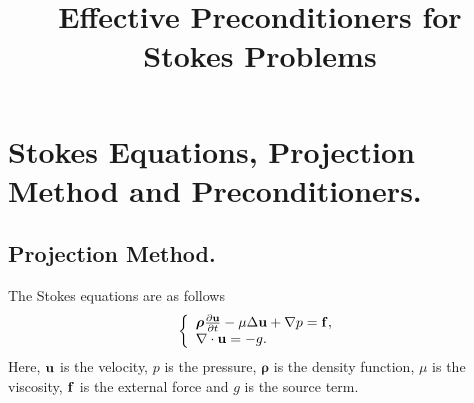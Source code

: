 \documentclass[9pt]{article}
\newcommand{\V}[1]{\boldsymbol{#1}}
\begin{document}
\title{Effective Preconditioners for Stokes Problems}


\date{}          %
\maketitle


%


\section{Stokes Equations, Projection Method and Preconditioners.}
\subsection{Projection Method.}
The Stokes equations are as follows
\begin{equation}\label{Time_Stokes}
 \left \{
        \begin{array} {ll}
                \V{\rho}\frac{\partial{\bf u}}{\partial t} -\mu \Delta{\bf u}+\nabla p
                      =\mathbf{f}, \\
                 \nabla\cdot{\bf u}=-g.
        \end{array}
               \right.
\end{equation}
Here, ${\bf u}$ is the velocity, $p$ is the pressure, $\V{\rho}$ is the density function, $\mu$ is the viscosity, ${\bf f}$ is the external force and $g$ is the source term.
\end{document}
